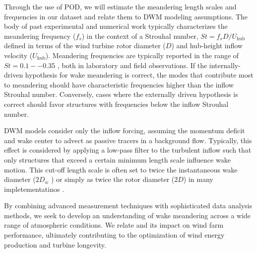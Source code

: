 \documentclass[%
 aip,
 amsmath,
 amssymb,
preprint,%
]{revtex4-2}
\begin{document}

Through the use of POD, we will estimate the meandering length scales and frequencies in our dataset and relate them to DWM modeling assumptions. 
The body of past experimental and numerical work typically characterizes the meandering frequency ($f_s$) in the context of a Strouhal number, $St = f_s D/U_\text{hub}$ defined in terms of the wind turbine rotor diameter ($D$) and hub-height inflow velocity ($U_\text{hub}$).
Meandering frequencies are typically reported in the range of $St = 0.1--0.35$ \cite{coudou2018experimental, heisel2018spectral,brugger2020lidar}, both in laboratory and field observations. 
If the internally-driven hypothesis for wake meandering is correct, the modes that contribute most to meandering should have characteristic frequencies higher than the inflow Strouhal number.
Conversely, cases where the externally driven hypothesis is correct should favor structures with frequencies below the inflow Strouhal number.

DWM models \cite{larsen2008wake} consider only the inflow forcing, assuming the momentum deficit and wake center to advect as passive tracers in a background flow. 
Typically, this effect is considered by applying a low-pass filter to the turbulent inflow such that only structures that exceed a certain minimum length scale influence wake motion. 
This cut-off length scale is often set to twice the instantaneous wake diameter ($2D_w$ \cite{larsen2008wake, jonkman2017development}) or simply as twice the rotor diameter ($2D$) in many impletementatinos \cite{shaler2019fast, shaler2019effects}.

By combining advanced measurement techniques with sophisticated data analysis methods, we seek to develop an understanding of wake meandering across a wide range of atmospheric conditions. We relate and its impact on wind farm performance, ultimately contributing to the optimization of wind energy production and turbine longevity.
\end{document}
